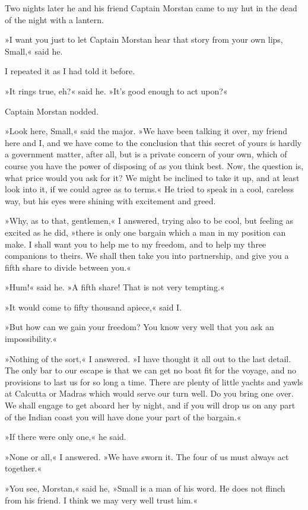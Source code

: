 Two nights later he and his friend Captain Morstan came to my hut in the dead of the night with a lantern.

»I want you just to let Captain Morstan hear that story from your own lips, Small,« said he.

I repeated it as I had told it before.

»It rings true, eh?« said he. »It's good enough to act upon?«

Captain Morstan nodded.

»Look here, Small,« said the major. »We have been talking it over, my friend here and I, and we have come to the conclusion that this secret of yours is hardly a government matter, after all, but is a private concern of your own, which of course you have the power of disposing of as you think best. Now, the question is, what price would you ask for it? We might be inclined to take it up, and at least look into it, if we could agree as to terms.« He tried to speak in a cool, careless way, but his eyes were shining with excitement and greed.

»Why, as to that, gentlemen,« I answered, trying also to be cool, but feeling as excited as he did, »there is only one bargain which a man in my position can make. I shall want you to help me to my freedom, and to help my three companions to theirs. We shall then take you into partnership, and give you a fifth share to divide between you.«

»Hum!« said he. »A fifth share! That is not very tempting.«

»It would come to fifty thousand apiece,« said I.

»But how can we gain your freedom? You know very well that you ask an impossibility.«

»Nothing of the sort,« I answered. »I have thought it all out to the last detail. The only bar to our escape is that we can get no boat fit for the voyage, and no provisions to last us for so long a time. There are plenty of little yachts and yawls at Calcutta or Madras which would serve our turn well. Do you bring one over. We shall engage to get aboard her by night, and if you will drop us on any part of the Indian coast you will have done your part of the bargain.«

»If there were only one,« he said.

»None or all,« I answered. »We have sworn it. The four of us must always act together.«

»You see, Morstan,« said he, »Small is a man of his word. He does not flinch from his friend. I think we may very well trust him.«

